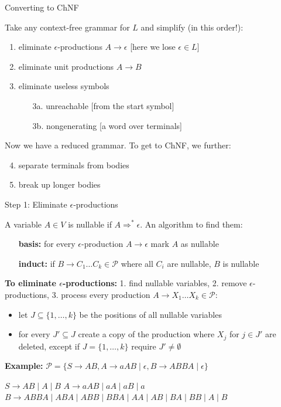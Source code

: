 \documentclass[handout]{beamer}
\begin{document}
\begin{frame}{Converting to ChNF}

	Take any context-free grammar for $L$ and simplify (\alert{in this order!}):
	
	\begin{enumerate}
		\item eliminate \alert{$\epsilon$-productions} $A\to\epsilon$
		\hfill{\small [here we lose $\epsilon\in L$]}
		\item eliminate \alert{unit productions} $A\to B$
		\item eliminate \alert{useless} symbols
		\begin{itemize}
			\item[3a.] \alert{unreachable} \hfill[from the start symbol]
			\item[3b.] \alert{nongenerating} \hfill[a word over terminals]
		\end{itemize} 
	\end{enumerate}

	Now we have a \alert{reduced} grammar. To get to ChNF, we further:
		
	\begin{enumerate}\setcounter{enumi}{3}
		\item \alert{separate} terminals from bodies
		\item \alert{break up} longer bodies
	\end{enumerate}

\end{frame}


\begin{frame}{Step 1: Eliminate $\epsilon$-productions}

	A variable $A\in V$ is \alert{nullable} if $A\Rightarrow^* \epsilon$. An algorithm to find them:
	\begin{itemize}
		\item[\textbf{basis:}] for every $\epsilon$-production $A\to \epsilon$ mark $A$ as nullable
		\item[\textbf{induct:}] if $B\to C_1 \ldots C_k\in\mathcal P$ where all $C_i$ are nullable, $B$ is nullable
	\end{itemize}

	\textbf{To eliminate $\epsilon$-productions:} 1. find nullable variables, 2. remove $\epsilon$-productions, 3. process every production $A\to X_1\ldots X_k \in \mathcal P$:
	\begin{itemize}
		\item let $J\subseteq\{1,\dots,k\}$ be the positions of all nullable variables
		\item for every $J'\subseteq J$ create a copy of the production where $X_j$ for $j\in J'$ are deleted, except if $J=\{1,\dots,k\}$ require $J'\neq\emptyset$
	\end{itemize}

	\textbf{Example:} $\mathcal P=\{S\to AB,A\to aAB\mid\epsilon,B\to ABBA\mid\epsilon\}$

	$S\to AB\mid A\mid B$
	$A\to aAB\mid aA\mid aB\mid a$
	$B\to ABBA\mid ABA\mid ABB\mid BBA\mid AA\mid AB\mid BA\mid BB\mid A\mid B$

\end{frame}
\end{document}
